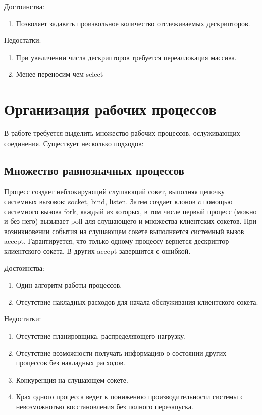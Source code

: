 Достоинства:
\begin{enumerate}
\item Позволяет задавать произвольное количество отслеживаемых дескрипторов.
\end{enumerate}

Недостатки:
\begin{enumerate}
\item При увеличении числа дескрипторов требуется переаллокация массива.
\item Менее переносим чем select~\cite{diff-poll-select}
\end{enumerate}

\section{Организация рабочих процессов}

В работе требуется выделить множество рабочих процессов, ослуживающих соединения.
Существует несколько подходов:

\subsection{Множество равнозначных процессов}

Процесс создает неблокирующий слушающий сокет, выполняя цепочку системных вызовов: socket, bind, listen.
Затем создает клонов c помощью системного вызова fork, каждый из которых, в том числе первый процесс (можно и без него) вызывает poll для слушающего и множества клиентских сокетов.
При возникновении события на слушающем сокете выполняется системный вызов accept.
Гарантируется, что только одному процессу вернется дескриптор клиентского сокета.
В других accept завершится с ошибкой.

Достоинства:
\begin{enumerate}
\item Один алгоритм работы процессов.
\item Отсутствие накладных расходов для начала обслуживания клиентского сокета.
\end{enumerate}

Недостатки:
\begin{enumerate}
\item Отсутствие планировщика, распределяющего нагрузку.
\item Отсутствие возможности получать информацию о состоянии других процессов без накладных расходов.
\item Конкуренция на слушающем сокете.
\item Крах одного процесса ведет к понижению производительности системы с невозможнотью восстановления без полного перезапуска.
\end{enumerate}

